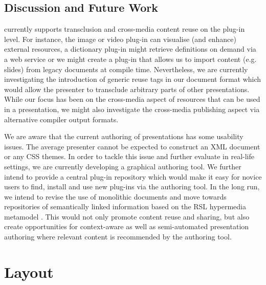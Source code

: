    \subsection{Discussion and Future Work}

    \mxp currently supports transclusion and cross-media content reuse on the
    plug-in level. For instance, the image or video plug-in can visualise (and
    enhance) external resources, a dictionary plug-in might retrieve
    definitions on demand via a web service or we might create a plug-in that
    allows us to import content (e.g. \ppt slides) from legacy documents at
    compile time. Nevertheless, we are currently investigating the introduction
    of generic reuse tags in our document format which would allow the
    presenter to transclude arbitrary parts of other \mxp presentations. While
    our focus has been on the cross-media aspect of resources that can be used
    in a presentation, we might also investigate the cross-media publishing
    aspect via alternative compiler output formats.

    We are aware that the current authoring of \mxp presentations has some
    usability issues. The average presenter cannot be expected to construct an
    XML document or any CSS themes. In order to tackle this issue and further
    evaluate \mxp in real-life settings, we are currently developing a
    graphical \mxp authoring tool. We further intend to provide a central
    plug-in repository which would make it easy for novice users to find,
    install and use new plug-ins via the authoring tool. In the long run, we
    intend to revise the use of monolithic documents and move towards
    repositories of semantically linked information based on the RSL hypermedia
    metamodel \citep{signer-3}. This would not only promote content reuse and
    sharing, but also create opportunities for context-aware as well as
    semi-automated presentation authoring where relevant content is recommended
    by the authoring tool.

  \section{Layout}

